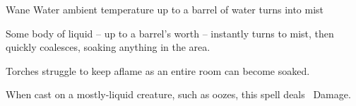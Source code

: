   {}%
  {Wane}%
  {Water}%
  {ambient temperature}%
  {up to a barrel of water turns into mist}%
  {
    Some body of liquid -- up to a barrel's worth -- instantly turns to mist, then quickly coalesces, soaking anything in the area.

    Torches struggle to keep aflame as an entire room can become soaked.

    When cast on a mostly-liquid creature, such as oozes, this spell deals \showDam~Damage.
  }

